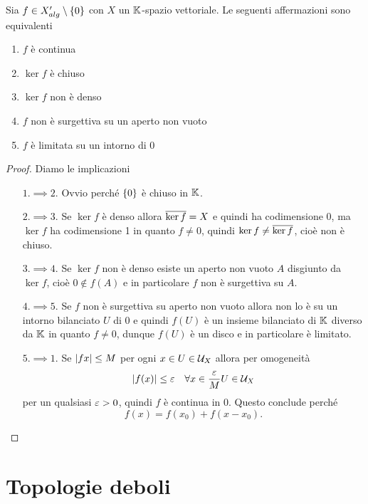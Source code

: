 \begin{proposition}\label{PrCaratterizzazioneFunzionaliContinui}
Sia $f\in X'_{alg}\setminus\{0\}$ con $X$ un $\mathbb{K}$-spazio vettoriale. Le seguenti affermazioni sono equivalenti
\begin{enumerate}
    \item $f$ \`e continua
    \item $\ker f$ \`e chiuso
    \item $\ker f$ non \`e denso
    \item $f$ non \`e surgettiva su un aperto non vuoto
    \item $f$ \`e limitata su un intorno di $0$
\end{enumerate}
\end{proposition}
\begin{proof}
    Diamo le implicazioni
\setlength{\leftmargini}{0cm}
\begin{itemize}
\item[$\boxed{1.\implies2.}$] Ovvio perch\'e $\left\{{0}\right\}$ \`e chiuso in $\mathbb{K}$.
\item[$\boxed{2.\implies3.}$] Se $\ker f$ \`e denso allora $\overline{\ker f}=X$ e quindi ha codimensione 0, ma $\ker f$ ha codimensione 1 in quanto $f\neq0$, quindi $\ker f\neq \overline{\ker f}$, cio\`e non \`e chiuso.
\item[$\boxed{3.\implies4.}$] Se $\ker f$ non \`e denso esiste un aperto non vuoto $A$ disgiunto da $\ker f$, cio\`e $0\notin f(A)$ e in particolare $f$ non \`e surgettiva su $A$.
\item[$\boxed{4.\implies5.}$] Se $f$ non \`e surgettiva su aperto non vuoto allora non lo \`e su un intorno bilanciato $U$ di $0$ e quindi $f(U)$ \`e un insieme bilanciato di $\mathbb{K}$ diverso da $\mathbb{K}$ in quanto $f\neq 0$, dunque $f(U)$ \`e un disco e in particolare \`e limitato.
\item[$\boxed{5.\implies1.}$] Se $\left|{fx}\right|\leq M$ per ogni $x\in U\in\mathcal{U}_X$ allora per omogeneit\`a
\[\left|{f(x)}\right|\leq \varepsilon\quad \forall x\in \frac{\varepsilon} M U\in \mathcal{U}_X\]
per un qualsiasi $\varepsilon>0$, quindi $f$ \`e continua in $0$. Questo conclude perch\'e
\[f(x)=f(x_0)+f(x-x_0).\]
\end{itemize}
\setlength{\leftmargini}{0.5cm}
\end{proof}





\section{Topologie deboli}

